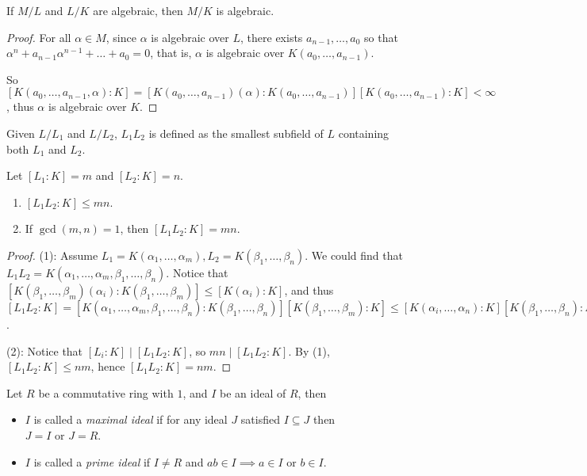 \begin{prop} \label{prop:alg-tower-implies-alg}
  If $M/L$ and $L/K$ are algebraic, then $M/K$ is algebraic.

  \begin{proof}
    For all $\alpha \in M$, since $\alpha$ is algebraic over $L$,
    there exists $a_{n-1}, \dots, a_0$ so that $\alpha^n + a_{n-1} \alpha^{n-1} + \dots + a_0 = 0$,
    that is, $\alpha$ is algebraic over $K(a_0, \dots, a_{n-1})$.

    So $[K(a_0, \dots, a_{n-1}, \alpha): K] = [K(a_0, \dots, a_{n-1})(\alpha): K(a_0, \dots, a_{n-1})]
    [K(a_0, \dots, a_{n-1}): K] < \infty$, thus $\alpha$ is algebraic over $K$.
  \end{proof}
\end{prop}

\begin{definition}
  Given $L/L_1$ and $L/L_2$, $L_1 L_2$ is defined as the smallest subfield of $L$
  containing both $L_1$ and $L_2$.
\end{definition}

\begin{prop}
  Let $[L_1: K] = m$ and $[L_2: K] = n$.
  \begin{enumerate}[(\arabic*)]
    \item $[L_1 L_2: K] \leq mn$.
    \item If $\gcd(m, n) = 1$, then $[L_1 L_2: K] = mn$.
  \end{enumerate}

  \begin{proof}
    (1): Assume $L_1 = K(\alpha_1, \dots, \alpha_m), L_2 = K(\beta_1, \dots, \beta_n)$.
    We could find that $L_1 L_2 = K(\alpha_1, \dots, \alpha_m, \beta_1, \dots, \beta_n)$.
    Notice that $[K(\beta_1, \dots, \beta_m)(\alpha_i): K(\beta_1, \dots, \beta_m)] \leq [K(\alpha_i): K]$,
    and thus $[L_1 L_2: K] = [K(\alpha_1, \dots, \alpha_m, \beta_1, \dots, \beta_n)
    : K(\beta_1, \dots, \beta_n)] [K(\beta_1, \dots, \beta_m): K] \leq [K(\alpha_i, \dots, \alpha_n): K]
    [K(\beta_1, \dots, \beta_n): K] = [L_1: K][L_2: K]$.

    (2): Notice that $[L_i: K] \mid [L_1 L_2: K]$, so $mn \mid [L_1 L_2: K]$. By
    (1), $[L_1 L_2: K] \leq nm$, hence $[L_1 L_2: K] = nm$.
  \end{proof}
\end{prop}

\begin{definition}
  Let $R$ be a commutative ring with $1$, and $I$ be an ideal of $R$, then
  \begin{itemize}
    \item $I$ is called a \emph{maximal ideal} if for any ideal $J$ satisfied
      $I \subseteq J$ then $J = I \text{ or } J = R$.
    \item $I$ is called a \emph{prime ideal}
      if $I \neq R$ and $ab \in I \implies a \in I \text{ or } b \in I$.
  \end{itemize}
\end{definition}

